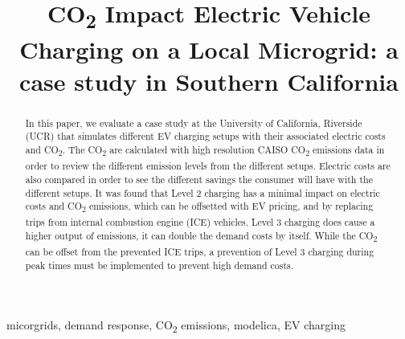 \documentclass[conference]{IEEEtran}
\begin{document}
\title{CO\textsubscript{2} Impact Electric Vehicle Charging on a Local Microgrid: a case study in Southern California }

\author{
}
\maketitle

\begin{abstract}

	In this paper, we evaluate a case study at the University of California, Riverside (UCR) that simulates different EV charging setups with their associated electric costs and CO\textsubscript{2}. The CO\textsubscript{2} are calculated with high resolution CAISO CO\textsubscript{2} emissions data in order to review the different emission levels from the different setups. Electric costs are also compared in order to see the different savings the consumer will have with the different setups. It was found that Level 2 charging has a minimal impact on electric costs and CO\textsubscript{2} emissions, which can be offsetted with EV pricing, and by replacing trips from internal combustion engine (ICE) vehicles. Level 3 charging does cause a higher output of emissions, it can double the demand costs by itself. While the CO\textsubscript{2} can be offset from the prevented ICE trips, a prevention of Level 3 charging during peak times must be implemented to prevent high demand costs.
	

\end{abstract}

\begin{IEEEkeywords}
micorgrids, demand response, CO\textsubscript{2} emissions, modelica, EV charging
\end{IEEEkeywords}
\end{document}
